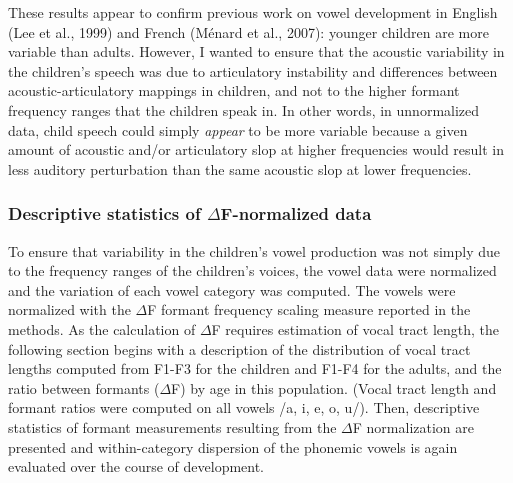 \documentclass[
]{article}
\begin{document}
These results appear to confirm previous work on vowel development in English (Lee et al., 1999) and French (Ménard et al., 2007): younger children are more variable than adults. However, I wanted to ensure that the acoustic variability in the children's speech was due to articulatory instability and differences between acoustic-articulatory mappings in children, and not to the higher formant frequency ranges that the children speak in. In other words, in unnormalized data, child speech could simply \emph{appear} to be more variable because a given amount of acoustic and/or articulatory slop at higher frequencies would result in less auditory perturbation than the same acoustic slop at lower frequencies.

\hypertarget{descriptive-statistics-of-deltaf-normalized-data}{%
\subsubsection{\texorpdfstring{Descriptive statistics of \(\Delta\)F-normalized data}{Descriptive statistics of \textbackslash DeltaF-normalized data}}\label{descriptive-statistics-of-deltaf-normalized-data}}

To ensure that variability in the children's vowel production was not simply due to the frequency ranges of the children's voices, the vowel data were normalized and the variation of each vowel category was computed. The vowels were normalized with the \(\Delta\)F formant frequency scaling measure reported in the methods. As the calculation of \(\Delta\)F requires estimation of vocal tract length, the following section begins with a description of the distribution of vocal tract lengths computed from F1-F3 for the children and F1-F4 for the adults, and the ratio between formants (\(\Delta\)F) by age in this population. (Vocal tract length and formant ratios were computed on all vowels /a, i, e, o, u/). Then, descriptive statistics of formant measurements resulting from the \(\Delta\)F normalization are presented and within-category dispersion of the phonemic vowels is again evaluated over the course of development.
\end{document}
